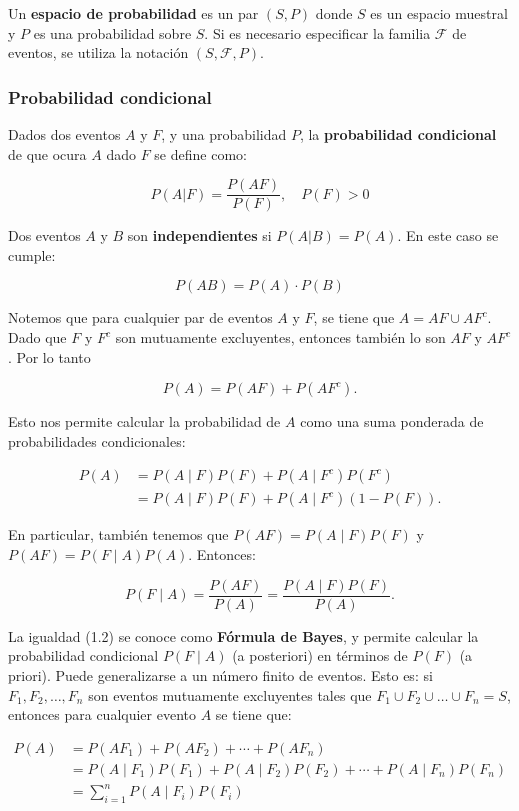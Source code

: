 \documentclass[11pt, a4paper]{article}
\theoremstyle{definition}
\begin{document}
Un \textbf{espacio de probabilidad} es un par $(S, P)$ donde $S$ es un espacio muestral y $P$ es una probabilidad sobre $S$. Si es necesario especificar la
familia $\mathcal{F}$ de eventos, se utiliza la notación $(S, \mathcal{F}, P)$.

\subsubsection{Probabilidad condicional}

Dados dos eventos $A$ y $F$, y una probabilidad $P$, la \textbf{probabilidad condicional} de que ocura $A$ dado $F$ se define como:

\[
P(A|F) = \frac{P(AF)}{P(F)}, \quad P(F) > 0
\]

Dos eventos $A$ y $B$ son \textbf{independientes} si $P(A|B) = P(A)$. En este caso se cumple:

\[
P(AB)=P(A)\cdot P(B)
\]

Notemos que para cualquier par de eventos $A$ y $F$, se tiene que $A = AF \cup AF^c$. 
Dado que $F$ y $F^c$ son mutuamente excluyentes, entonces también lo son $AF$ y $AF^c$. Por lo tanto

\[
P(A) = P(AF) + P(AF^c).
\]

Esto nos permite calcular la probabilidad de $A$ como una suma ponderada de probabilidades condicionales:

\begin{align*}
P(A) &= P(A \mid F)P(F) + P(A \mid F^c)P(F^c) \\
     &= P(A \mid F)P(F) + P(A \mid F^c)(1 - P(F)). \tag{1.1}
\end{align*}

En particular, también tenemos que $P(AF) = P(A \mid F)P(F)$ y $P(AF) = P(F \mid A)P(A)$. Entonces:

\[
P(F \mid A) = \frac{P(AF)}{P(A)} = \frac{P(A \mid F)P(F)}{P(A)}. \tag{1.2}
\]

La igualdad (1.2) se conoce como \textbf{Fórmula de Bayes}, y permite calcular la probabilidad condicional $P(F \mid A)$ (a posteriori) en términos de $P(F)$ (a priori). Puede generalizarse a un número finito de eventos. Esto es: si $F_1, F_2, \dots, F_n$ son eventos mutuamente excluyentes tales que $F_1 \cup F_2 \cup \dots \cup F_n = S$, entonces para cualquier evento $A$ se tiene que:

\begin{align*}
P(A) &= P(AF_1) + P(AF_2) + \cdots + P(AF_n) \\
     &= P(A \mid F_1)P(F_1) + P(A \mid F_2)P(F_2) + \cdots + P(A \mid F_n)P(F_n) \\
     &= \sum_{i=1}^{n} P(A \mid F_i)P(F_i)
\end{align*}
\end{document}
